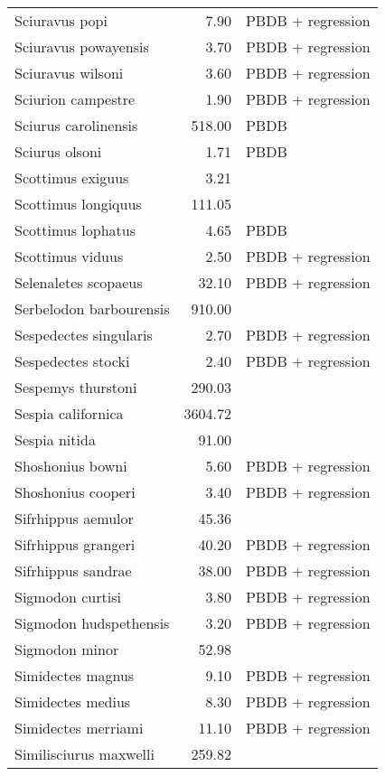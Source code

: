 \begin{table}[ht]
\begin{tabular}{lrl}
  Sciuravus popi & 7.90 & PBDB + regression \\ 
  Sciuravus powayensis & 3.70 & PBDB + regression \\ 
  Sciuravus wilsoni & 3.60 & PBDB + regression \\ 
  Sciurion campestre & 1.90 & PBDB + regression \\ 
  Sciurus carolinensis & 518.00 & PBDB \\ 
  Sciurus olsoni & 1.71 & PBDB \\ 
  Scottimus exiguus & 3.21 & \cite{Novacek1977} \\ 
  Scottimus longiquus & 111.05 & \cite{Tomiya2013} \\ 
  Scottimus lophatus & 4.65 & PBDB \\ 
  Scottimus viduus & 2.50 & PBDB + regression \\ 
  Selenaletes scopaeus & 32.10 & PBDB + regression \\ 
  Serbelodon barbourensis & 910.00 & \cite{Secord2008a} \\ 
  Sespedectes singularis & 2.70 & PBDB + regression \\ 
  Sespedectes stocki & 2.40 & PBDB + regression \\ 
  Sespemys thurstoni & 290.03 & \cite{Tomiya2013} \\ 
  Sespia californica & 3604.72 & \cite{Tomiya2013} \\ 
  Sespia nitida & 91.00 & \cite{VanValkenburgh2007a} \\ 
  Shoshonius bowni & 5.60 & PBDB + regression \\ 
  Shoshonius cooperi & 3.40 & PBDB + regression \\ 
  Sifrhippus aemulor & 45.36 & \cite{Osborn1933} \\ 
  Sifrhippus grangeri & 40.20 & PBDB + regression \\ 
  Sifrhippus sandrae & 38.00 & PBDB + regression \\ 
  Sigmodon curtisi & 3.80 & PBDB + regression \\ 
  Sigmodon hudspethensis & 3.20 & PBDB + regression \\ 
  Sigmodon minor & 52.98 & \cite{Tomiya2013} \\ 
  Simidectes magnus & 9.10 & PBDB + regression \\ 
  Simidectes medius & 8.30 & PBDB + regression \\ 
  Simidectes merriami & 11.10 & PBDB + regression \\ 
  Similisciurus maxwelli & 259.82 & \cite{Tomiya2013} \\ 

\end{tabular}
\end{table}
